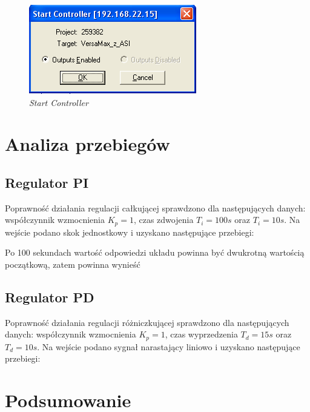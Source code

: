 \documentclass[12pt]{article}
\begin{document}
\begin{figure}[H]
    \centering
    \includegraphics[]{./zdj/start}
    \caption{\textit{Start Controller}}
    \label{start}
\end{figure}


\section{Analiza przebiegów}
\subsection{Regulator PI}
Poprawność działania regulacji całkującej sprawdzono dla następujących danych: współczynnik wzmocnienia $K_p=1$, czas zdwojenia $T_i = 100s$ oraz $T_i = 10s$. Na wejście podano skok jednostkowy i uzyskano następujące przebiegi:

Po 100 sekundach wartość odpowiedzi układu powinna być dwukrotną wartością początkową, zatem powinna wynieść 


\subsection{Regulator PD}
Poprawność działania regulacji różniczkującej sprawdzono dla następujących danych: współczynnik wzmocnienia $K_p=1$, czas wyprzedzenia $T_d = 15s$ oraz $T_d = 10s$. Na wejście podano sygnał narastający liniowo i uzyskano następujące przebiegi:


\section{Podsumowanie}
\end{document}
